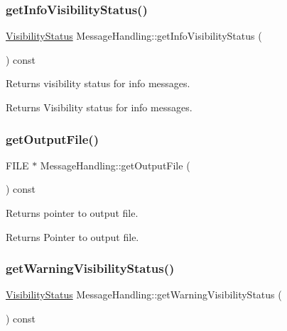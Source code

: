 \subsubsection{\texorpdfstring{get\+Info\+Visibility\+Status()}{getInfoVisibilityStatus()}}
{\footnotesize\ttfamily \hyperlink{_types_8hpp_a36503475bb1fea0a7fd7087259ee63c1}{Visibility\+Status} Message\+Handling\+::get\+Info\+Visibility\+Status (\begin{DoxyParamCaption}{ }\end{DoxyParamCaption}) const\hspace{0.3cm}{\ttfamily [inline]}}

Returns visibility status for info messages. \begin{DoxyReturn}{Returns}
Visibility status for info messages. 
\end{DoxyReturn}
\mbox{\label{class_message_handling_a6c79ada9dcfed04df8cdda3b9368f38c}} 
\subsubsection{\texorpdfstring{get\+Output\+File()}{getOutputFile()}}
{\footnotesize\ttfamily F\+I\+LE $\ast$ Message\+Handling\+::get\+Output\+File (\begin{DoxyParamCaption}{ }\end{DoxyParamCaption}) const\hspace{0.3cm}{\ttfamily [inline]}}

Returns pointer to output file. \begin{DoxyReturn}{Returns}
Pointer to output file. 
\end{DoxyReturn}
\mbox{\label{class_message_handling_abb3b7874c8c06e9ddefcc7dfa3aa739e}} 
\subsubsection{\texorpdfstring{get\+Warning\+Visibility\+Status()}{getWarningVisibilityStatus()}}
{\footnotesize\ttfamily \hyperlink{_types_8hpp_a36503475bb1fea0a7fd7087259ee63c1}{Visibility\+Status} Message\+Handling\+::get\+Warning\+Visibility\+Status (\begin{DoxyParamCaption}{ }\end{DoxyParamCaption}) const\hspace{0.3cm}{\ttfamily [inline]}}


